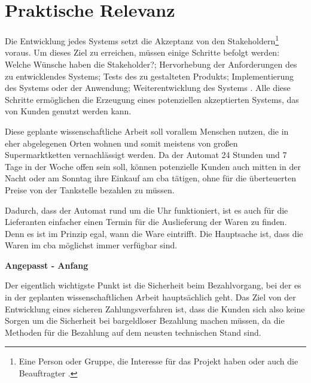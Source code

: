 \section{Praktische Relevanz}

Die Entwicklung jedes Systems setzt die Akzeptanz von den Stakeholdern\footnote{Eine Person oder Gruppe, die Interesse für das Projekt 
haben oder auch die Beauftragter \cite{refip:HSSI}.} voraus. Um dieses Ziel zu erreichen, müssen einige Schritte befolgt
werden: Welche Wünsche haben die Stakeholder?; Hervorhebung der Anforderungen des zu entwicklendes Systems;
Tests des zu gestalteten Produkts; Implementierung des Systems oder der Anwendung; Weiterentwicklung des
Systems \cite{refbook:RECR}. Alle diese Schritte ermöglichen die Erzeugung eines potenziellen akzeptierten 
Systems, das von Kunden genutzt werden kann.

Diese geplante wissenschaftliche Arbeit soll vorallem Menschen nutzen, die in eher abgelegenen Orten wohnen und somit 
meistens von großen Supermarktketten vernachlässigt werden.
Da der Automat 24 Stunden und 7 Tage in der Woche offen sein soll, können potenzielle Kunden 
auch mitten in der Nacht oder am Sonntag ihre Einkauf am \acrfull{cba} tätigen,
ohne für die überteuerten Preise von der Tankstelle bezahlen zu müssen. 


Dadurch, dass der Automat rund um die Uhr funktioniert, ist es auch für die Lieferanten einfacher einen Termin für die Auslieferung 
der Waren zu finden. Denn es ist im Prinzip egal, wann die Ware eintrifft. Die Hauptsache ist, dass die Waren im \acrfull{cba}
möglichst immer verfügbar sind. 

\textbf{Angepasst - Anfang}


Der eigentlich wichtigste Punkt ist die Sicherheit beim Bezahlvorgang, bei der es in der geplanten wissenschaftlichen Arbeit 
hauptsächlich geht. Das Ziel von der Entwicklung eines sicheren Zahlungsverfahren ist, dass die Kunden sich also keine Sorgen 
um die Sicherheit bei bargeldloser Bezahlung machen müssen, da die Methoden für die Bezahlung auf dem neusten technischen Stand sind.

